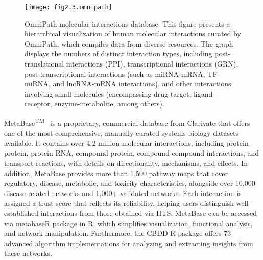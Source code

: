 \begin{figure}[htbp]
    \centering
    \texttt{[image: fig2.3.omnipath]}
    \caption[OmniPath molecular interactions database.]{OmniPath molecular interactions database. This figure presents a hierarchical visualization of human molecular interactions curated by OmniPath, which compiles data from diverse resources. The graph displays the numbers of distinct interaction types, including post-translational interactions (\gls{PPI}), transcriptional interactions (\gls{GRN}), post-transcriptional interactions (such as miRNA-\gls{mRNA}, \gls{TF}-miRNA, and lncRNA-\gls{mRNA} interactions), and other interactions involving small molecules (encompassing drug-target, ligand-receptor, enzyme-metabolite, among others).}
    \label{fig:fig2.3.omnipath}
\end{figure}

MetaBase\textsuperscript{TM}~\cite{RN33} is a proprietary, commercial database from Clarivate that offers one of the most comprehensive, manually curated systems biology datasets available. It contains over 4.2 million molecular interactions, including protein-protein, protein-RNA, compound-protein, compound-compound interactions, and transport reactions, with details on directionality, mechanisms, and effects. In addition, MetaBase provides more than 1,500 pathway maps that cover regulatory, disease, metabolic, and toxicity characteristics, alongside over 10,000 disease-related networks and 1,000+ validated networks. Each interaction is assigned a trust score that reflects its reliability, helping users distinguish well-established interactions from those obtained via \gls{HTS}. MetaBase can be accessed via metabaseR package in \gls{R}, which simplifies visualization, functional analysis, and network manipulation. Furthermore, the \gls{CBDD} \gls{R} package offers 73 advanced algorithm implementations for analyzing and extracting insights from these networks.

